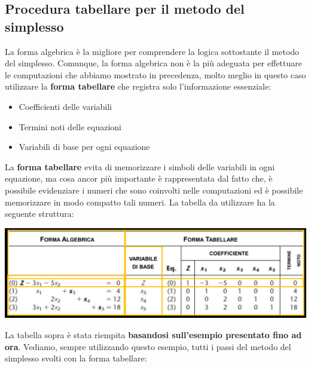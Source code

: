 \documentclass[12pt]{article}
\begin{document}
\subsection{Procedura tabellare per il metodo del simplesso}
La forma algebrica è la migliore per comprendere la logica sottostante il metodo del simplesso.
Comunque, la forma algebrica non è la più adeguata per effettuare le computazioni che abbiamo mostrato in precedenza, molto meglio in questo caso utilizzare la \textbf{forma tabellare} che
registra solo l'informazione essenziale:
\begin{itemize}
    \item Coefficienti delle variabili
    \item Termini noti delle equazioni
    \item Variabili di base per ogni equazione
\end{itemize}
La \textbf{forma tabellare} evita di memorizzare i simboli delle variabili in ogni equazione, ma cosa ancor più importante è rappresentata dal fatto che, è possibile evidenziare i numeri che sono coinvolti nelle computazioni ed è possibile memorizzare in modo
compatto tali numeri. La tabella da utilizzare ha la seguente struttura:
\begin{center}
    \includegraphics[width = 1\textwidth]{Images/28.PNG}
\end{center}
La tabella sopra è stata riempita \textbf{basandosi sull'esempio presentato fino ad ora}. Vediamo, sempre utilizzando questo esempio, tutti i passi del metodo del simplesso svolti con la forma tabellare:
\end{document}
